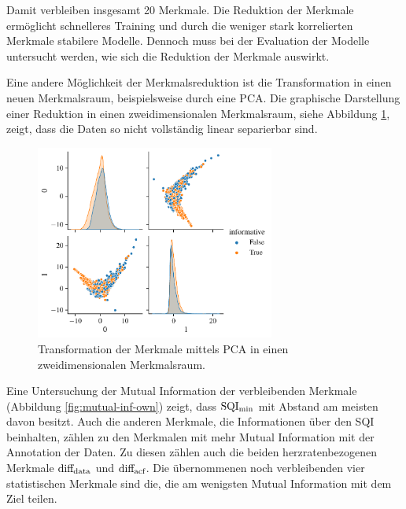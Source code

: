Damit verbleiben insgesamt 20 Merkmale. Die Reduktion der Merkmale ermöglicht schnelleres Training und durch die weniger stark korrelierten Merkmale stabilere Modelle. Dennoch muss bei der Evaluation der Modelle untersucht werden, wie sich die Reduktion der Merkmale auswirkt.

Eine andere Möglichkeit der Merkmalsreduktion ist die Transformation in einen neuen Merkmalsraum, beispielsweise durch eine \ac{PCA}. Die graphische Darstellung einer Reduktion in einen zweidimensionalen Merkmalsraum, siehe Abbildung \ref{fig:pca-own-reduced}, zeigt, dass die Daten so nicht vollständig linear separierbar sind.

\begin{figure}[H] %
	\centering
	\includegraphics[width=0.7\textwidth]{pic/pca-own-reduced.pdf}
	\caption{Transformation der Merkmale mittels PCA in einen zweidimensionalen Merkmalsraum.}
	\label{fig:pca-own-reduced}
\end{figure}

Eine Untersuchung der Mutual Information der verbleibenden Merkmale (Abbildung \ref{fig:mutual-inf-own}) zeigt, dass $\text{SQI}\textsubscript{min}$ mit Abstand am meisten davon besitzt. Auch die anderen Merkmale, die Informationen über den \ac{SQI} beinhalten, zählen zu den Merkmalen mit mehr Mutual Information mit der Annotation der Daten. Zu diesen zählen auch die beiden herzratenbezogenen Merkmale $\text{diff}\textsubscript{data}$ und $\text{diff}\textsubscript{acf}$. Die übernommenen noch verbleibenden vier statistischen Merkmale sind die, die am wenigsten Mutual Information mit dem Ziel teilen.


